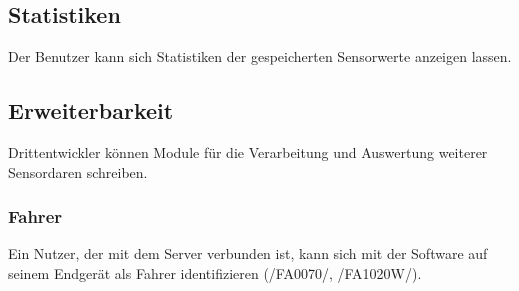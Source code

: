 \documentclass[pflichtenheft.tex]{subfiles}
\begin{document}
\subsection{\mkfa Statistiken} Der Benutzer kann sich Statistiken der gespeicherten Sensorwerte anzeigen lassen.

\subsection{\mkfa Erweiterbarkeit} Drittentwickler können Module für die Verarbeitung und Auswertung weiterer Sensordaren schreiben.

\subsubsection{\mkfaw Fahrer} Ein Nutzer, der mit dem Server verbunden ist, kann sich mit der Software auf seinem Endgerät als Fahrer identifizieren (/FA0070/, /FA1020W/).
\end{document}
